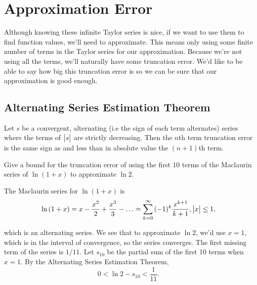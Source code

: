\section{Approximation Error}
Although knowing these infinite Taylor series is nice, if we want to use them to find function values, we'll need to approximate.
This means only using some finite number of terms in the Taylor series for our approximation.
Because we're not using all the terms, we'll naturally have some truncation error.
We'd like to be able to say how big this truncation error is so we can be sure that our approximation is good enough.

\subsection{Alternating Series Estimation Theorem}
\begin{theorem}
	Let $s$ be a convergent, alternating (i.e the sign of each term alternates) series where the terms of $\big\lvert s \big\rvert$ are strictly decreasing.
	Then the $n$th term truncation error is the same sign as and less than in absolute value the $(n+1)$th term.
\end{theorem}

\begin{example}
	Give a bound for the truncation error of using the first 10 terms of the Maclaurin series of $\ln{(1+x)}$ to approximate $\ln{2}$.
\end{example}
\begin{answer}
	The Maclaurin series for $\ln{(1+x)}$ is
	\begin{equation*}
		\ln{(1+x)} = x - \frac{x^2}{2} + \frac{x^3}{3} - \ldots = \sum_{k=0}^{\infty}{(-1)^k\frac{x^{k+1}}{k+1}}, \big\lvert x \big\rvert \leq 1,
	\end{equation*}
	
	which is an alternating series.
	We see that to approximate $\ln{2}$, we'd use $x=1$, which is in the interval of convergence, so the series converges.
	The first missing term of the series is $1/11$.
	Let $s_{10}$ be the partial sum of the first 10 terms when $x=1$.
	By the Alternating Series Estimation Theorem,
	\begin{equation*}
		0 < \ln{2} - s_{10} < \frac{1}{11}. 
	\end{equation*}
\end{answer}

